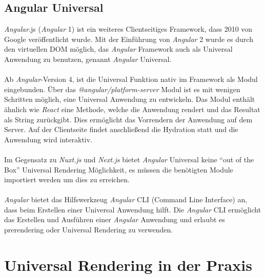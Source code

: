 \documentclass[runningheads]{llncs}
\begin{document}
\subsection{Angular Universal}
\label{subsec:Angular Universal}
\textit{Angular}.js (\textit{Angular} 1) ist ein weiteres Clientseitiges Framework, 
dass 2010 von Google veröffentlicht wurde. 
Mit der Einführung von \textit{Angular} 2 wurde es durch den virtuellen DOM möglich, 
das \textit{Angular} Framework auch als Universal Anwendung zu benutzen, 
genannt \textit{Angular} Universal. 
\\
\\
Ab \textit{Angular}-Version 4, 
ist die Universal Funktion nativ im Framework als Modul eingebunden. 
Über das \textit{@angular/platform-server} Modul ist es mit wenigen Schritten möglich, 
eine Universal Anwendung zu entwickeln. 
Das Modul enthält ähnlich wie \textit{React} eine Methode, 
welche die Anwendung rendert und das Resultat als String zurückgibt. 
Dies ermöglicht das Vorrendern der Anwendung auf dem Server. 
Auf der Clientseite findet anschließend die Hydration statt und 
die Anwendung wird interaktiv. 
\\
\\
Im Gegensatz zu \textit{Nuxt.js} und \textit{Next.js} bietet \textit{Angular} Universal keine 
“out of the Box” Universal Rendering Möglichkeit, 
es müssen die benötigten Module importiert werden um dies zu erreichen. 
\\
\\
\textit{Angular} bietet das Hilfswerkzeug \textit{Angular} CLI (Command Line Interface) an, 
dass beim Erstellen einer Universal Anwendung hilft. 
Die \textit{Angular} CLI ermöglicht das Erstellen und Ausführen einer \textit{Angular} Anwendung und 
erlaubt es prerendering oder Universal Rendering zu verwenden. 

\newpage

\section{Universal Rendering in der Praxis}
\label{sec:Universal Rendering in der Praxis}
\end{document}
